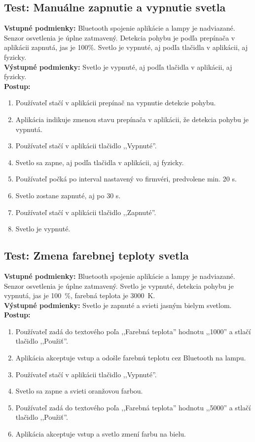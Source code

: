 \documentclass[12pt, a4paper]{article}
\begin{document}
\subsection{Test: Manuálne zapnutie a vypnutie svetla}
\noindent\textbf{Vstupné podmienky:} Bluetooth spojenie aplikácie a lampy je nadviazané. Senzor osvetlenia je úplne zatmavený. Detekcia pohybu je podľa prepínača v aplikácii zapnutá, jas je 100\%. Svetlo je vypnuté, aj podľa tlačidla v aplikácii, aj fyzicky. \\
\textbf{Výstupné podmienky:} Svetlo je vypnuté, aj podľa tlačidla v aplikácii, aj fyzicky. \\
\textbf{Postup:}
\begin{enumerate}
\itemsep0pt
\item Používateľ stačí v aplikácii prepínač na vypnutie detekcie pohybu.
\item Aplikácia indikuje zmenou stavu prepínača v aplikácii, že detekcia pohybu je vypnutá.
\item Používateľ stačí v aplikácii tlačidlo ,,Vypnuté''.
\item Svetlo sa zapne, aj podľa tlačidla v aplikácii, aj fyzicky.
\item Používateľ počká po interval nastavený vo firmvéri, predvolene min. 20 s.
\item Svetlo zostane zapnuté, aj po 30 s.
\item Používateľ stačí v aplikácii tlačidlo ,,Zapnuté''.
\item Svetlo je vypnuté.
\end{enumerate}

\subsection{Test: Zmena farebnej teploty svetla}
\noindent\textbf{Vstupné podmienky:} Bluetooth spojenie aplikácie a lampy je nadviazané. Senzor osvetlenia je úplne zatmavený. Svetlo je vypnuté, detekcia pohybu je vypnutá, jas je 100~\%, farebná teplota je 3000~K. \\
\textbf{Výstupné podmienky:} Svetlo je zapnuté a svieti jasným bielym svetlom. \\
\textbf{Postup:}
\begin{enumerate}
\itemsep0pt
\item Používateľ zadá do textového poľa ,,Farebná teplota'' hodnotu ,,1000'' a stlačí tlačidlo ,,Použiť''.
\item Aplikácia akceptuje vstup a odošle farebnú teplotu cez Bluetooth na lampu.
\item Používateľ stačí v aplikácii tlačidlo ,,Vypnuté''.
\item Svetlo sa zapne a svieti oranžovou farbou.
\item Používateľ zadá do textového poľa ,,Farebná teplota'' hodnotu ,,5000'' a stlačí tlačidlo ,,Použiť''.
\item Aplikácia akceptuje vstup a svetlo zmení farbu na bielu.
\end{enumerate}
\end{document}
